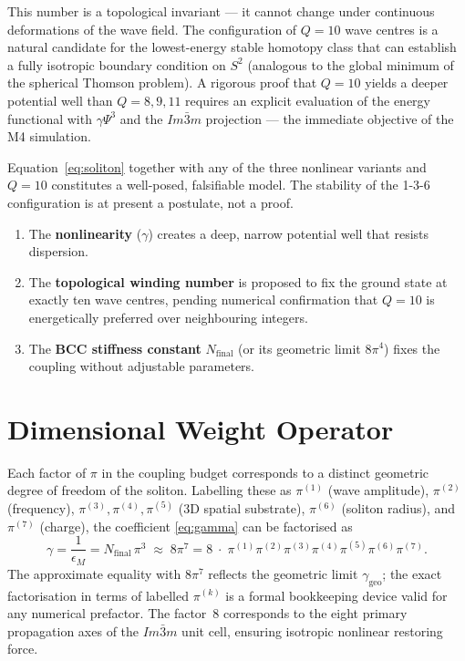 \documentclass[11pt,a4paper]{article}
\begin{document}
	This number is a topological invariant --- it cannot change under
	continuous deformations of the wave field.  The configuration of
	$Q=10$ wave centres is a natural candidate for the lowest-energy
	stable homotopy class that can establish a fully isotropic boundary
	condition on $S^{2}$ (analogous to the global minimum of the spherical
	Thomson problem).  A rigorous proof that $Q=10$ yields a deeper
	potential well than $Q=8,9,11$ requires an explicit evaluation of the
	energy functional with $\gamma\Psi^{3}$ and the $Im\bar{3}m$ projection
	--- the immediate objective of the M4 simulation.
	
	Equation~\eqref{eq:soliton} together with any of the three nonlinear
	variants and $Q=10$ constitutes a well-posed, falsifiable model.  The
	stability of the 1-3-6 configuration is at present a postulate, not a
	proof.
	
	\begin{enumerate}
		\item The \textbf{nonlinearity} ($\gamma$) creates a deep, narrow
		potential well that resists dispersion.
		\item The \textbf{topological winding number} is proposed to fix the
		ground state at exactly ten wave centres, pending numerical
		confirmation that $Q=10$ is energetically preferred over
		neighbouring integers.
		\item The \textbf{BCC stiffness constant} $N_{\text{final}}$ (or its
		geometric limit $8\pi^{4}$) fixes the coupling without adjustable
		parameters.
	\end{enumerate}
	
	\section{Dimensional Weight Operator}
	
	Each factor of $\pi$ in the coupling budget corresponds to a distinct
	geometric degree of freedom of the soliton.  Labelling these as
	$\pi^{(1)}$ (wave amplitude), $\pi^{(2)}$ (frequency),
	$\pi^{(3)},\pi^{(4)},\pi^{(5)}$ (3D spatial substrate),
	$\pi^{(6)}$ (soliton radius), and $\pi^{(7)}$ (charge), the
	coefficient \eqref{eq:gamma} can be factorised as
	\begin{equation}\label{eq:factor}
		\gamma = \frac{1}{\epsilon_{M}} = N_{\text{final}}\,\pi^{3}
		\;\approx\; 8\pi^{7}
		= 8\;\cdot\;\pi^{(1)}\pi^{(2)}\pi^{(3)}\pi^{(4)}\pi^{(5)}\pi^{(6)}\pi^{(7)} .
	\end{equation}
	The approximate equality with $8\pi^{7}$ reflects the geometric limit
	$\gamma_{\text{geo}}$; the exact factorisation in terms of labelled
	$\pi^{(k)}$ is a formal bookkeeping device valid for any numerical
	prefactor.  The factor~8 corresponds to the eight primary propagation
	axes of the $Im\bar{3}m$ unit cell, ensuring isotropic nonlinear
	restoring force.
	
\end{document}

